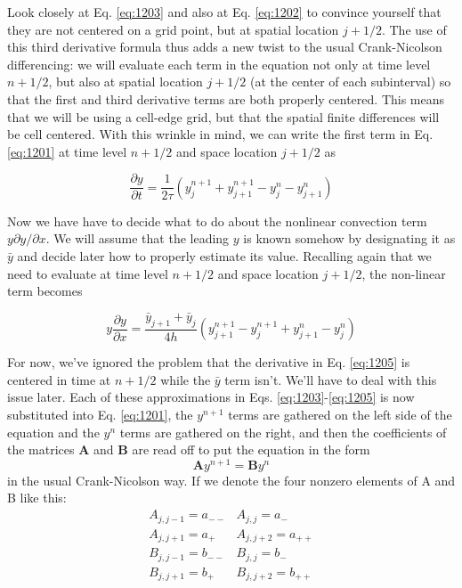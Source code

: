 Look closely at Eq. \eqref{eq:1203} and also at Eq. \eqref{eq:1202} to convince yourself that they are not centered on a grid point, but at spatial location $j+1 / 2$. The use of this third derivative formula thus adds a new twist to the usual Crank-Nicolson differencing: we will evaluate each term in the equation not only at time level $n+1 / 2$, but also at spatial location $j+1 / 2$ (at the center of each subinterval) so that the first and third derivative terms are both properly centered. This means that we will be using a cell-edge grid, but that the spatial finite differences will be cell centered.
With this wrinkle in mind, we can write the first term in Eq. \eqref{eq:1201} at time level $n+1 / 2$ and space location $j+1 / 2$ as

\begin{equation}\label{eq:1204}
\frac{\partial y}{\partial t}=\frac{1}{2 \tau}\left(y_{j}^{n+1}+y_{j+1}^{n+1}-y_{j}^{n}-y_{j+1}^{n}\right)
\end{equation}

Now we have have to decide what to do about the nonlinear convection term $y \partial y / \partial x$. We will assume that the leading $y$ is known somehow by designating it as $\bar{y}$ and decide later how to properly estimate its value. Recalling again that we need to evaluate at time level $n+1 / 2$ and space location $j+1 / 2$, the non-linear term becomes

\begin{equation}\label{eq:1205}
y \frac{\partial y}{\partial x}=\frac{\bar{y}_{j+1}+\bar{y}_{j}}{4 h}\left(y_{j+1}^{n+1}-y_{j}^{n+1}+y_{j+1}^{n}-y_{j}^{n}\right)
\end{equation}

For now, we\rq ve ignored the problem that the derivative in Eq. \eqref{eq:1205} is centered in time at $n+1 / 2$ while the $\bar{y}$ term isn't. We\rq ll have to deal with this issue later.
Each of these approximations in Eqs. \eqref{eq:1203}-\eqref{eq:1205} is now substituted into Eq. \eqref{eq:1201}, the $y^{n+1}$ terms are gathered on the left side of the equation and the $y^{n}$ terms are gathered on the right, and then the coefficients of the matrices $\mathbf{A}$ and $\mathbf{B}$ are read off to put the equation in the form
\begin{equation}\label{eq:1206}
\mathbf{A} y^{n+1}=\mathbf{B} y^{n}
\end{equation}
in the usual Crank-Nicolson way. If we denote the four nonzero elements of A
and B like this:
\begin{equation}\label{eq:1207}
\begin{array}{ll}
A_{j, j-1}=a_{--} & A_{j, j}=a_{-} \\
A_{j, j+1}=a_{+} & A_{j, j+2}=a_{++} \\
B_{j, j-1}=b_{--} & B_{j, j}=b_{-} \\
B_{j, j+1}=b_{+} & B_{j, j+2}=b_{++}
\end{array}
\end{equation}

